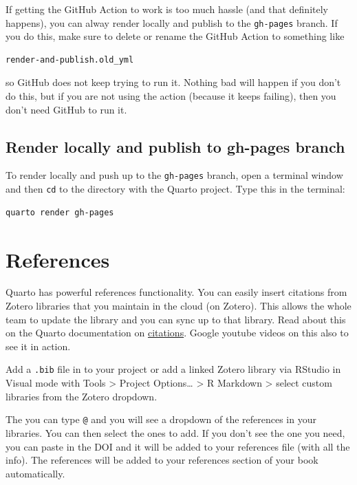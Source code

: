 \documentclass[
  letterpaper,
  oneside,
  open=any]{scrbook}
\begin{document}
If getting the GitHub Action to work is too much hassle (and that
definitely happens), you can alway render locally and publish to the
\texttt{gh-pages} branch. If you do this, make sure to delete or rename
the GitHub Action to something like

\begin{verbatim}
render-and-publish.old_yml
\end{verbatim}

so GitHub does not keep trying to run it. Nothing bad will happen if you
don't do this, but if you are not using the action (because it keeps
failing), then you don't need GitHub to run it.

\section{Render locally and publish to gh-pages
branch}\label{render-locally-and-publish-to-gh-pages-branch}

To render locally and push up to the \texttt{gh-pages} branch, open a
terminal window and then \texttt{cd} to the directory with the Quarto
project. Type this in the terminal:

\begin{verbatim}
quarto render gh-pages
\end{verbatim}


\chapter{References}\label{references}

Quarto has powerful references functionality. You can easily insert
citations from Zotero libraries that you maintain in the cloud (on
Zotero). This allows the whole team to update the library and you can
sync up to that library. Read about this on the Quarto documentation on
\href{https://quarto.org/docs/visual-editor/technical.html\#citations}{citations}.
Google youtube videos on this also to see it in action.

Add a \texttt{.bib} file in to your project or add a linked Zotero
library via RStudio in Visual mode with Tools \textgreater{} Project
Options\ldots{} \textgreater{} R Markdown \textgreater{} select custom
libraries from the Zotero dropdown.

The you can type \texttt{@} and you will see a dropdown of the
references in your libraries. You can then select the ones to add. If
you don't see the one you need, you can paste in the DOI and it will be
added to your references file (with all the info). The references will
be added to your references section of your book automatically.
\end{document}
